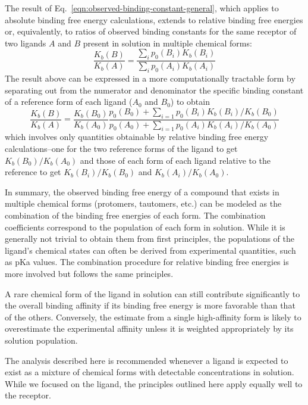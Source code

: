 \documentclass[9pt,bestpractices]{livecoms}
\begin{document}
The result of Eq.~\ref{eqn:observed-binding-constant-general}, which applies to absolute binding free energy calculations, extends to relative binding free energies or, equivalently, to ratios of observed binding constants for the same receptor of two ligands $A$ and $B$ present in solution in multiple chemical forms:
\begin{equation}
  \frac{K_b(B)}{K_b(A)} = \frac{\sum_i p_0(B_i) K_b(B_i)}{\sum_i p_0(A_i) K_b(A_i)}
  \label{eqn:observed-binding-constant-ratio}
\end{equation}
The result above can be expressed in a more computationally tractable form by separating out from the numerator and denominator the specific binding constant of a reference form of each ligand ($A_0$ and $B_0$) to obtain~\cite{de2018rigorous}
\begin{equation}
 \frac{K_b(B)}{K_b(A)} = \frac{K_b(B_0)}{K_b(A_0)} \frac{
 p_0(B_0) + \sum_{i=1} p_0(B_i) K_b(B_i)/K_b(B_0)
 }{
p_0(A_0) + \sum_{i=1} p_0(A_i) K_b(A_i)/K_b(A_0)
 }
\end{equation}
which involves only quantities obtainable by relative binding free energy calculations--one for the two reference forms of the ligand to get  $K_b(B_0)/K_b(A_0)$ and those of each form of each ligand relative to the reference to get $K_b(B_i)/K_b(B_0)$ and $K_b(A_i)/K_b(A_0)$.

In summary, the observed binding free energy of a compound that exists in multiple chemical forms (protomers, tautomers, etc.) can be modeled as the combination of the binding free energies of each form. The combination coefficients correspond to the population of each form in solution. While it is generally not trivial to obtain them from first principles, the populations of the ligand's chemical states can often be derived from experimental quantities, such as pKa values. The combination procedure for relative binding free energies is more involved but follows the same principles. 

A rare chemical form of the ligand in solution can still contribute significantly to the overall binding affinity if its binding free energy is more favorable than that of the others. Conversely, the estimate from a single high-affinity form is likely to overestimate the experimental affinity unless it is weighted appropriately by its solution population. 

The analysis described here is recommended whenever a ligand is expected to exist as a mixture of chemical forms with detectable concentrations in solution. While we focused on the ligand, the principles outlined here apply equally well to the receptor. 
\end{document}
